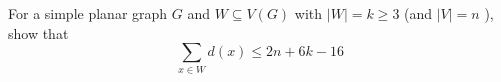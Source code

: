 \question For a simple planar graph \(G\) and \(W \subseteq
V(G)\) with \(|W| = k \geq 3\) (and \(|V|=n\) ), show that
\[ \sum_{x \in W} d(x) \leq 2 n+6 k-16 \]
